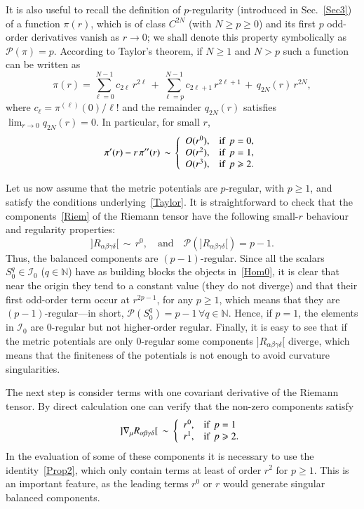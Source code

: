 \documentclass[aps,prd,a4paper,twocolumn,showpacs,showkeys,preprintnumbers,amsmath,amssymb,nofootinbib]{revtex4-2}
\numberwithin{equation}{section}
\def\beq{\begin{equation}}
\def\eeq{\end{equation}}
\def\al{\alpha}
\def\be{\beta}
\def\ga{\gamma}
\def\de{\delta}
\def\na{\nabla}
\begin{document}
It is also useful to recall the definition of $p$-regularity (introduced in Sec.~\ref{Sec3}) of a function $\pi(r)$, which is of class $C^{2N}$ (with $N\geqslant p \geqslant 0$) and its first $p$ odd-order derivatives vanish as $r\to 0$; we shall denote this property symbolically as $\mathscr{P}(\pi)=p$. 
 According to Taylor's theorem, if $N\geqslant 1$ and $N>p$ such a function can be written as
\beq \label{Taylor}
\pi(r) = \sum_{\ell=0}^{N-1} c_{2\ell} \, r^{2\ell} \, + \, \sum_{\ell=p}^{N-1} c_{2\ell+1} \, r^{2\ell+1} \, + \, q_{2N}(r) \, r^{2N},
\eeq
where $c_\ell = \pi^{(\ell)}(0)/\ell !$ and the remainder $q_{2N}(r)$ satisfies \\ $\lim_{r\to 0}q_{2N}(r) = 0$. 
In particular, for small $r$,
\beq  \label{Prop2}
\pi^\prime(r) - r \, \pi^{\prime\prime}(r) \, \sim \,  \left\{ 
\begin{array}{l l}
O(r^0)  ,  &  \text{if } \,  p =0,\\
O(r^2)  ,  &  \text{if } \,  p =1,\\
O(r^3)  ,  &  \text{if } \,  p \geqslant 2.
\end{array} \right .
\eeq

Let us now assume that the metric potentials are $p$-regular, with $p \geqslant 1$, and satisfy the conditions underlying~\eqref{Taylor}. It is straightforward to check that the components~\eqref{Riem} of the Riemann tensor have the following small-$r$ behaviour and regularity properties:
%
\beq \label{Hom0}
{]R_{\al\be\ga\de}[}  \, \sim \, r^0 , \quad \text{and} \quad \mathscr{P}({]R_{\al\be\ga\de}[}) = p - 1.
\eeq
Thus, the balanced components are $(p-1)$-regular. Since all the scalars $S^q_0 \in \mathscr{I}_{0}$ ($q\in\mathbb{N}$) have as building blocks the objects in~\eqref{Hom0}, it is clear that near the origin they tend to a constant value (they do not diverge) and that their first odd-order term occur at $r^{2p-1}$, for any $p \geqslant 1$, which means that they are $(p-1)$-regular---in short, $\mathscr{P}(S^q_0) = p-1 \, \forall q\in\mathbb{N}$. Hence, if $p=1$, the elements in $\mathscr{I}_{0}$ are 0-regular but not higher-order regular. Finally, it is easy to see that if the metric potentials are only 0-regular some components ${]R_{\al\be\ga\de}[}$ diverge, which means that the finiteness of the potentials is not enough to avoid curvature singularities. 

The next step is consider terms with one covariant derivative of the Riemann tensor. By direct calculation one can verify that the non-zero components satisfy
%
\beq \label{Hom1}
{]\na_\mu R_{\al\be\ga\de}[} \, \sim \, \left\{ 
\begin{array}{l l}
r^0  ,  &  \text{if } \,  p = 1 
\\
r^1  ,  &  \text{if } \,  p \geqslant 2. 
\end{array} \right .
\eeq
%
In the evaluation of some of these components it is necessary to use the identity~\eqref{Prop2}, which only contain terms at least of order $r^2$ for $p\geqslant 1$. This is an important feature, as the leading terms $r^0$ or $r$ would generate singular balanced components.
\end{document}
